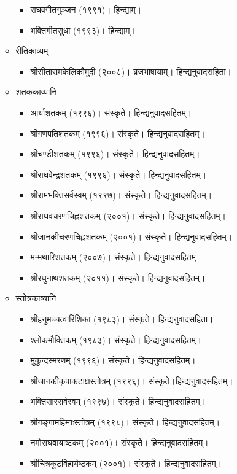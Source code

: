 \begin{itemize}
\begin{itemize}
	\begin{itemize}
		\item राघवगीतगुञ्जन (१९९१)। हिन्द्याम्।
		\item भक्तिगीतसुधा (१९९३)। हिन्द्याम्।
	\end{itemize}
	\item रीतिकाव्यम्
	\begin{itemize}
		\item श्रीसीतारामकेलिकौमुदी (२००८)। ब्रजभाषायाम्। हिन्द्यनुवादसहिता।
	\end{itemize}
	\item शतककाव्यानि
	\begin{itemize}
		\item आर्याशतकम् (१९९६)। संस्कृते। हिन्द्यनुवादसहितम्।
		\item श्रीगणपतिशतकम् (१९९६)। संस्कृते। हिन्द्यनुवादसहितम्।
		\item श्रीचण्डीशतकम् (१९९६)। संस्कृते। हिन्द्यनुवादसहितम्।
		\item श्रीराघवेन्द्रशतकम् (१९९६)। संस्कृते। हिन्द्यनुवादसहितम्।
		\item श्रीरामभक्तिसर्वस्वम् (१९९७)। संस्कृते। हिन्द्यनुवादसहितम्।
		\item श्रीराघवचरणचिह्नशतकम् (२००१)। संस्कृते। हिन्द्यनुवादसहितम्।
		\item श्रीजानकीचरणचिह्नशतकम् (२००१)। संस्कृते। हिन्द्यनुवादसहितम्।
		\item मन्मथारिशतकम् (२००७)। संस्कृते। हिन्द्यनुवादसहितम्।
		\item श्रीरघुनाथशतकम् (२०११)। संस्कृते। हिन्द्यनुवादसहितम्।
	\end{itemize}
	\item स्तोत्रकाव्यानि
	\begin{itemize}
		\item श्रीहनुमच्चत्वारिंशिका (१९८३)। संस्कृते। हिन्द्यनुवादसहिता।
		\item श्लोकमौक्तिकम् (१९८३)। संस्कृते। हिन्द्यनुवादसहितम्।
		\item मुकुन्दस्मरणम् (१९९६)। संस्कृते। हिन्द्यनुवादसहितम्।
		\item श्रीजानकीकृपाकटाक्षस्तोत्रम् (१९९६)। संस्कृते।हिन्द्यनुवादसहितम्।
		\item भक्तिसारसर्वस्वम् (१९९७)। संस्कृते। हिन्द्यनुवादसहितम्।
		\item श्रीगङ्गामहिम्नःस्तोत्रम् (१९९८)। संस्कृते। हिन्द्यनुवादसहितम्।
		\item नमोराघवायाष्टकम् (२००१)। संस्कृते। हिन्द्यनुवादसहितम्।
		\item श्रीचित्रकूटविहार्यष्टकम् (२००१)। संस्कृते। हिन्द्यनुवादसहितम्।

\end{itemize}
\end{itemize}
\end{itemize}
